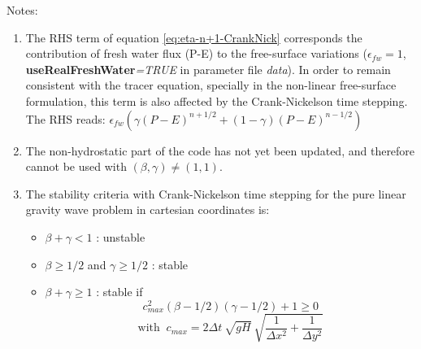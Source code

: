
\noindent
Notes:
\begin{enumerate}
\item The RHS term of equation \ref{eq:eta-n+1-CrankNick} 
corresponds the contribution of fresh water flux (P-E) 
to the free-surface variations ($\epsilon_{fw}=1$, 
{\bf useRealFreshWater}{\em=TRUE} in parameter file {\em data}).
In order to remain consistent with the tracer equation, specially in 
the non-linear free-surface formulation, this term is also 
affected by the Crank-Nickelson time stepping. The RHS reads:
$\epsilon_{fw} ( \gamma (P-E)^{n+1/2} + (1-\gamma) (P-E)^{n-1/2} )$
\item The non-hydrostatic part of the code has not yet been 
updated, and therefore cannot be used with $(\beta,\gamma) \neq (1,1)$.
\item The stability criteria with Crank-Nickelson time stepping
for the pure linear gravity wave problem in cartesian coordinates is:
\begin{itemize}
\item $\beta + \gamma < 1$ : unstable
\item $\beta \geq 1/2$ and $ \gamma \geq 1/2$ : stable
\item $\beta + \gamma \geq 1$ : stable if
$$ 
c_{max}^2 (\beta - 1/2)(\gamma - 1/2) + 1 \geq 0
$$
$$
\mbox{with }~
c_{max} =  2 \Delta t \: \sqrt{g H} \: 
\sqrt{ \frac{1}{\Delta x^2} + \frac{1}{\Delta y^2} }
$$
\end{itemize}
\end{enumerate}

